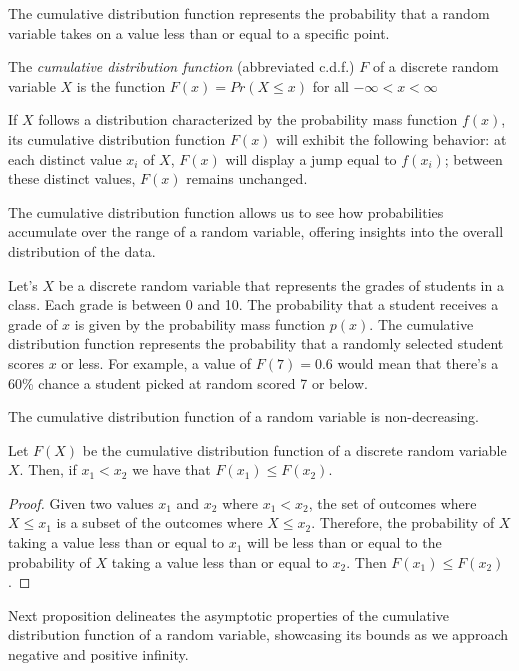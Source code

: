 The cumulative distribution function represents the probability that a random variable takes on a value less than or equal to a specific point.

\begin{definition}
The \emph{cumulative distribution function} (abbreviated c.d.f.) $F$ of a discrete random variable $X$ is the function $F(x)=Pr(X\leq x)$ for all $-\infty < x < \infty$
\end{definition}

If $X$ follows a distribution characterized by the probability mass function $f(x)$, its cumulative distribution function $F(x)$ will exhibit the following behavior: at each distinct value $x_i$ of $X$, $F(x)$ will display a jump equal to $f(x_i)$; between these distinct values, $F(x)$ remains unchanged.

The cumulative distribution function allows us to see how probabilities accumulate over the range of a random variable, offering insights into the overall distribution of the data.

\begin{example}
Let's $X$ be a discrete random variable that represents the grades of students in a class. Each grade is between 0 and 10. The probability that a student receives a grade of $x$ is given by the probability mass function $p(x)$. The cumulative distribution function represents the probability that a randomly selected student scores $x$ or less. For example, a value of $F(7) =
0.6$ would mean that there's a 60\% chance a student picked at random scored 7 or below.
\end{example}

The cumulative distribution function of a random variable is non-decreasing. 

\begin{proposition}
Let $F(X)$ be the cumulative distribution function of a discrete random variable $X$. Then, if $x_{1}<x_{2}$ we have that $F\left(x_{1}\right)\leq F\left(x_{2}\right)$.
\end{proposition}
\begin{proof}
Given two values $x_1$ and $x_2$ where $x_1 < x_2$, the set of outcomes where $X \leq x_1$ is a subset of the outcomes where $X \leq x_2$.  Therefore, the probability of $X$ taking a value less than or equal to $x_1$ will be less than or equal to the probability of $X$ taking a value less than or equal to $x_2$. Then $F(x_1) \leq F(x_2)$.
\end{proof}

Next proposition delineates the asymptotic properties of the cumulative distribution function of a random variable, showcasing its bounds as we approach negative and positive infinity.

